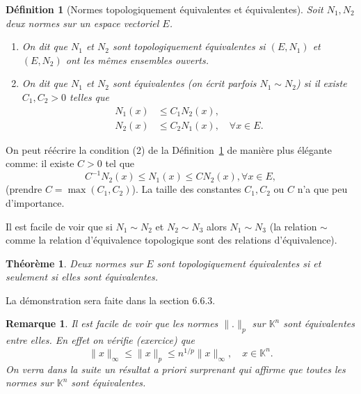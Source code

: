 \documentclass{article}
\newtheorem{theorem}{Théorème}
\newtheorem{definition}{Définition}
\newtheorem{remark}{Remarque}
\begin{document}
\begin{definition}[Normes topologiquement équivalentes et équivalentes]
\label{def:norm_equivalence}
Soit $N_1, N_2$ deux normes sur un espace vectoriel $E$.
\begin{enumerate}
    \item On dit que $N_1$ et $N_2$ sont topologiquement équivalentes si $(E, N_1)$ et $(E, N_2)$ ont les mêmes ensembles ouverts.
    \item On dit que $N_1$ et $N_2$ sont équivalentes (on écrit parfois $N_1 \sim N_2$) si il existe $C_1, C_2 > 0$ telles que
    \begin{align*}
        N_1(x) &\leq C_1 N_2(x), \\
        N_2(x) &\leq C_2 N_1(x), \quad \forall x \in E.
    \end{align*}
\end{enumerate}
\end{definition}
On peut réécrire la condition (2) de la Définition~\ref{def:norm_equivalence} de manière plus élégante comme: il existe $C > 0$ tel que
\begin{equation}
    C^{-1} N_2(x) \leq N_1(x) \leq C N_2(x), \forall x \in E,
\end{equation}
(prendre $C = \max(C_1, C_2)$). La taille des constantes $C_1, C_2$ ou $C$ n'a que peu d'importance.

Il est facile de voir que si $N_1 \sim N_2$ et $N_2 \sim N_3$ alors $N_1 \sim N_3$ (la relation $\sim$ comme la relation d'équivalence topologique sont des relations d'équivalence).

\begin{theorem}
\label{thm:topo_equiv_iff_equiv}
Deux normes sur $E$ sont topologiquement équivalentes si et seulement si elles sont équivalentes.
\end{theorem}

La démonstration sera faite dans la section 6.6.3.

\begin{remark}
\label{rem:norms_equiv_in_Rn}
Il est facile de voir que les normes $\|.\|_p$ sur $\mathbb{K}^n$ sont équivalentes entre elles. En effet on vérifie (exercice) que
\begin{equation}
    \|x\|_\infty \leq \|x\|_p \leq n^{1/p} \|x\|_\infty, \quad x \in \mathbb{K}^n.
\end{equation}
On verra dans la suite un résultat a priori surprenant qui affirme que toutes les normes sur $\mathbb{K}^n$ sont équivalentes.
\end{remark}
\end{document}
